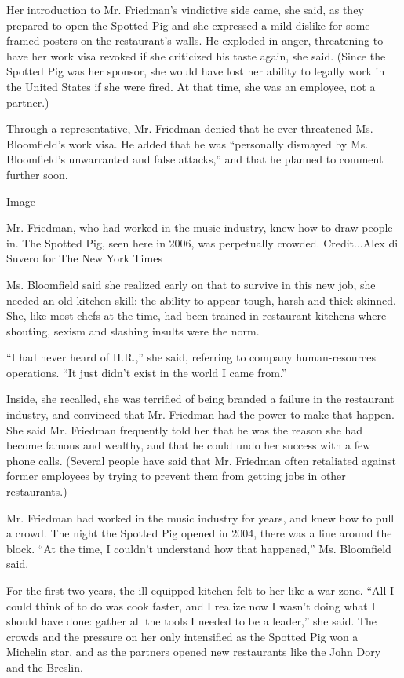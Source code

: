 Her introduction to Mr. Friedman's vindictive side came, she said, as
they prepared to open the Spotted Pig and she expressed a mild dislike
for some framed posters on the restaurant's walls. He exploded in anger,
threatening to have her work visa revoked if she criticized his taste
again, she said. (Since the Spotted Pig was her sponsor, she would have
lost her ability to legally work in the United States if she were fired.
At that time, she was an employee, not a partner.)

Through a representative, Mr. Friedman denied that he ever threatened
Ms. Bloomfield's work visa. He added that he was ``personally dismayed
by Ms. Bloomfield's unwarranted and false attacks,'' and that he planned
to comment further soon.

Image

Mr. Friedman, who had worked in the music industry, knew how to draw
people in. The Spotted Pig, seen here in 2006, was perpetually crowded.
Credit...Alex di Suvero for The New York Times

Ms. Bloomfield said she realized early on that to survive in this new
job, she needed an old kitchen skill: the ability to appear tough, harsh
and thick-skinned. She, like most chefs at the time, had been trained in
restaurant kitchens where shouting, sexism and slashing insults were the
norm.

``I had never heard of H.R.,'' she said, referring to company
human-resources operations. ``It just didn't exist in the world I came
from.''

Inside, she recalled, she was terrified of being branded a failure in
the restaurant industry, and convinced that Mr. Friedman had the power
to make that happen. She said Mr. Friedman frequently told her that he
was the reason she had become famous and wealthy, and that he could undo
her success with a few phone calls. (Several people have said that Mr.
Friedman often retaliated against former employees by trying to prevent
them from getting jobs in other restaurants.)

Mr. Friedman had worked in the music industry for years, and knew how to
pull a crowd. The night the Spotted Pig opened in 2004, there was a line
around the block. ``At the time, I couldn't understand how that
happened,'' Ms. Bloomfield said.

For the first two years, the ill-equipped kitchen felt to her like a war
zone. ``All I could think of to do was cook faster, and I realize now I
wasn't doing what I should have done: gather all the tools I needed to
be a leader,'' she said. The crowds and the pressure on her only
intensified as the Spotted Pig won a Michelin star, and as the partners
opened new restaurants like the John Dory and the Breslin.


